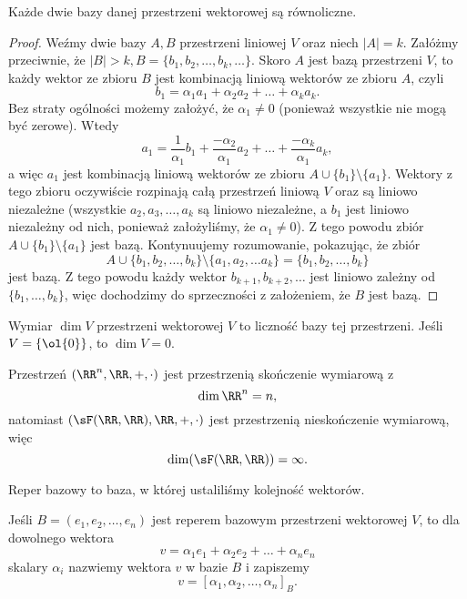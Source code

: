 \begin{theorem}
    \label{t:equinumerous bases}
    Każde dwie bazy danej przestrzeni wektorowej są równoliczne.
\end{theorem}
\begin{proof}
    Weźmy dwie bazy $A, B$ przestrzeni liniowej $V$ oraz niech $|A| = k$. Załóżmy przeciwnie, że $|B| > k, B = \{b_1, b_2, \ldots, b_k, \ldots\}$. Skoro $A$ jest bazą przestrzeni $V$, to każdy wektor ze zbioru $B$ jest kombinacją liniową wektorów ze zbioru $A$, czyli
    \[ b_1 = \alpha_1a_1 + \alpha_2a_2 + \ldots + \alpha_ka_k. \]
    Bez straty ogólności możemy założyć, że $\alpha_1 \neq 0$ (ponieważ wszystkie nie mogą być zerowe). Wtedy
    \[ a_1 = \frac{1}{\alpha_1}b_1 + \frac{-\alpha_2}{\alpha_1}a_2 + \ldots + \frac{-\alpha_k}{\alpha_1}a_k, \]
    a więc $a_1$ jest kombinacją liniową wektorów ze zbioru $A \cup \{b_1\} \setminus \{a_1\}$. Wektory z tego zbioru oczywiście rozpinają całą przestrzeń liniową $V$ oraz są liniowo niezależne (wszystkie $a_2, a_3, \ldots, a_k$ są liniowo niezależne, a $b_1$ jest liniowo niezależny od nich, ponieważ założyliśmy, że $\alpha_1 \neq 0$). Z tego powodu zbiór $A \cup \{b_1\} \setminus \{a_1\}$ jest bazą. Kontynuujemy rozumowanie, pokazując, że zbiór
    \[ A \cup \{b_1, b_2, \ldots, b_k\} \setminus \{a_1, a_2, \ldots a_k\} = \{b_1, b_2, \ldots, b_k\} \]
    jest bazą. Z tego powodu każdy wektor $b_{k+1}, b_{k+2}, \ldots$ jest liniowo zależny od $\{b_1, \ldots, b_k\}$, więc dochodzimy do sprzeczności z założeniem, że $B$ jest bazą.
\end{proof}

\begin{definition}
    Wymiar $\dim V$ przestrzeni wektorowej $V$ to liczność bazy tej przestrzeni. Jeśli $V = \{\ol{0}\}$, to $\dim V = 0$.
\end{definition}

\begin{example}
    Przestrzeń $(\RR^n, \RR, +, \cdot)$ jest przestrzenią skończenie wymiarową z
    \[ \dim\RR^n = n, \]
    natomiast $(\sF(\RR,\RR), \RR, +, \cdot)$ jest przestrzenią nieskończenie wymiarową, więc
    \[ \dim (\sF(\RR,\RR)) = \infty. \]
\end{example}

\begin{definition}
    Reper bazowy to baza, w której ustaliliśmy kolejność wektorów.
\end{definition}

Jeśli $B = (e_1, e_2, \ldots, e_n)$ jest reperem bazowym przestrzeni wektorowej $V$, to dla dowolnego wektora
\[ v = \alpha_1e_1 + \alpha_2e_2 + \ldots + \alpha_ne_n \]
skalary $\alpha_i$ nazwiemy  wektora $v$ w bazie $B$ i zapiszemy
\[ v = [\alpha_1, \alpha_2, \ldots, \alpha_n]_B. \]

